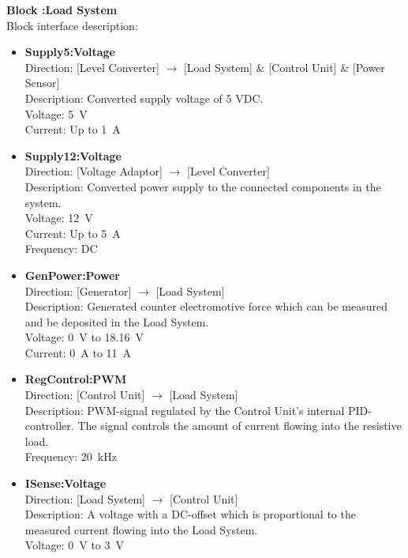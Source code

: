 \newpage							
\textbf{Block :Load System}\\ 
Block interface description:
\begin{itemize}
	\item \textbf{Supply5:Voltage}\\
	Direction: [Level Converter] $\rightarrow$ [Load System] \& [Control Unit] \& [Power Sensor]\\
	Description: Converted supply voltage of 5 VDC.\\
	Voltage: \SI{5}{\volt}\\
	Current: Up to \SI{1}{\ampere}
	\item \textbf{Supply12:Voltage}\\
	Direction: [Voltage Adaptor] $\rightarrow$ [Level Converter]\\
	Description: Converted power supply to the connected components in the system.\\
	Voltage: \SI{12}{\volt}\\
	Current: Up to \SI{5}{\ampere}\\
	Frequency: DC
	\item \textbf{GenPower:Power}\\
	Direction: [Generator] $\rightarrow$ [Load System]\\
	Description: Generated counter electromotive force which can be measured and be deposited in the Load System.\\
	Voltage: \SI{0}{\volt} to \SI{18.16}{\volt}\\
	Current: \SI{0}{\ampere} to \SI{11}{\ampere}
	\item \textbf{RegControl:PWM}\\
	Direction: [Control Unit] $\rightarrow$ [Load System]\\
	Description: PWM-signal regulated by the Control Unit's internal PID-controller. The signal controls the amount of current flowing into the resistive load.\\
	Frequency: \SI{20}{\kilo \hertz}
	\item \textbf{ISense:Voltage}\\
	Direction: [Load System] $\rightarrow$ [Control Unit]\\
	Description: A voltage with a DC-offset which is proportional to the measured current flowing into the Load System.\\
	Voltage: \SI{0}{\volt} to \SI{3}{\volt}
\end{itemize}
								
